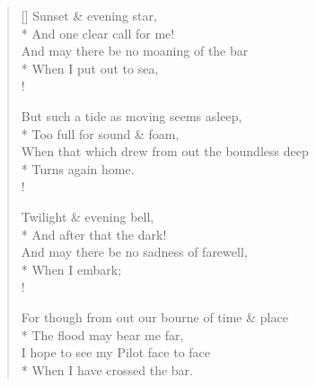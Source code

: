 \documentclass[MAIN]{subfiles}
\begin{document}
\settowidth{\versewidth}{And may there be no moaning of the bar}
\begin{verse}[\versewidth]
Sunset \& evening star,\\*
\vin And one clear call for me!\\
And may there be no moaning of the bar\\*
\vin When I put out to sea,\\!

But such a tide as moving seems asleep,\\*
\vin Too full for sound \& foam,\\
When that which drew from out the boundless deep\\* 
\vin Turns again home.\\!

Twilight \& evening bell,\\*
\vin And after that the dark!\\
And may there be no sadness of farewell,\\*
\vin When I embark;\\!

For though from out our bourne of time \& place\\*
\vin The flood may bear me far,\\
I hope to see my Pilot face to face\\*
\vin When I have crossed the bar.
\end{verse}
\end{document}
